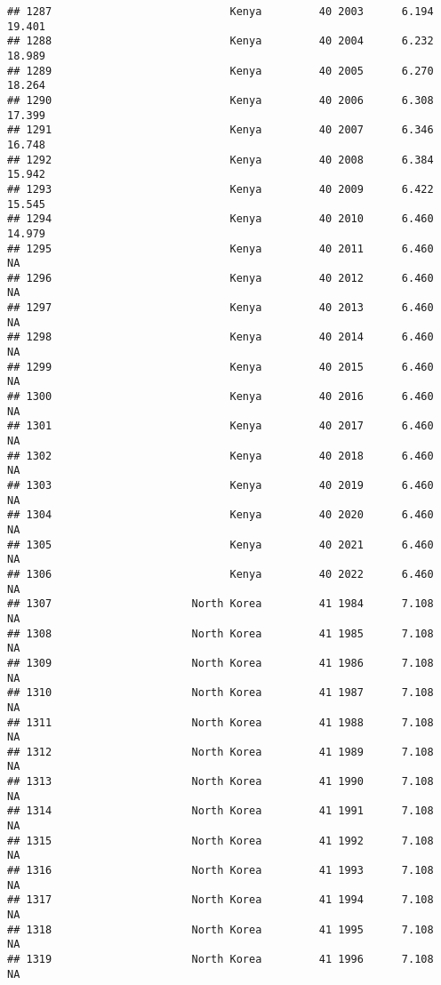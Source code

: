 \documentclass[
]{article}
\begin{document}
\begin{verbatim}
## 1287                            Kenya         40 2003      6.194     19.401
## 1288                            Kenya         40 2004      6.232     18.989
## 1289                            Kenya         40 2005      6.270     18.264
## 1290                            Kenya         40 2006      6.308     17.399
## 1291                            Kenya         40 2007      6.346     16.748
## 1292                            Kenya         40 2008      6.384     15.942
## 1293                            Kenya         40 2009      6.422     15.545
## 1294                            Kenya         40 2010      6.460     14.979
## 1295                            Kenya         40 2011      6.460         NA
## 1296                            Kenya         40 2012      6.460         NA
## 1297                            Kenya         40 2013      6.460         NA
## 1298                            Kenya         40 2014      6.460         NA
## 1299                            Kenya         40 2015      6.460         NA
## 1300                            Kenya         40 2016      6.460         NA
## 1301                            Kenya         40 2017      6.460         NA
## 1302                            Kenya         40 2018      6.460         NA
## 1303                            Kenya         40 2019      6.460         NA
## 1304                            Kenya         40 2020      6.460         NA
## 1305                            Kenya         40 2021      6.460         NA
## 1306                            Kenya         40 2022      6.460         NA
## 1307                      North Korea         41 1984      7.108         NA
## 1308                      North Korea         41 1985      7.108         NA
## 1309                      North Korea         41 1986      7.108         NA
## 1310                      North Korea         41 1987      7.108         NA
## 1311                      North Korea         41 1988      7.108         NA
## 1312                      North Korea         41 1989      7.108         NA
## 1313                      North Korea         41 1990      7.108         NA
## 1314                      North Korea         41 1991      7.108         NA
## 1315                      North Korea         41 1992      7.108         NA
## 1316                      North Korea         41 1993      7.108         NA
## 1317                      North Korea         41 1994      7.108         NA
## 1318                      North Korea         41 1995      7.108         NA
## 1319                      North Korea         41 1996      7.108         NA

\end{verbatim}
\end{document}
